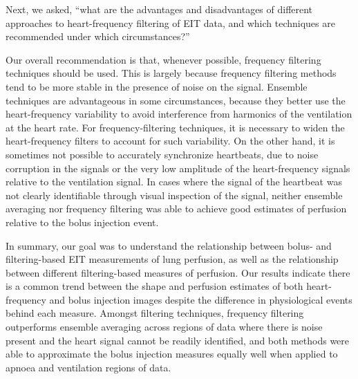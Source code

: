 Next, we asked, ``what are the advantages and disadvantages of different approaches
to heart-frequency filtering of EIT data, and which techniques are recommended
under which circumstances?''

Our overall recommendation is that, whenever possible, 
frequency filtering techniques should be used. This is largely
because frequency filtering methods tend to be more stable in the 
presence of noise on the signal. 
Ensemble techniques are advantageous
in some circumstances, because they better use the heart-frequency
variability to avoid interference from harmonics of the
ventilation at the heart rate. For frequency-filtering
techniques, it is necessary to widen the heart-frequency
filters to account for such variability.
On the other hand, it is sometimes not possible to accurately
synchronize heartbeats, due to noise corruption in the
signals or the very low amplitude of the heart-frequency signals
relative to the ventilation signal.
In cases where the signal of the heartbeat 
was not clearly identifiable through visual inspection of the signal, neither 
ensemble averaging nor frequency filtering was able to achieve good 
estimates of perfusion relative to the bolus injection event. 

In summary, 
our goal was to understand the relationship between bolus- and filtering-based
EIT measurements of lung perfusion, as well as the relationship between different
filtering-based measures of perfusion.
Our results indicate there is a common trend between the shape and perfusion  
estimates of both heart-frequency and bolus injection images 
despite the difference in physiological events behind each measure.
Amongst filtering techniques, frequency
filtering outperforms ensemble averaging across regions of data where there is noise present and the 
heart signal cannot be readily identified, and both methods were able to approximate the bolus injection 
measures equally well when applied to apnoea and ventilation regions of data.

